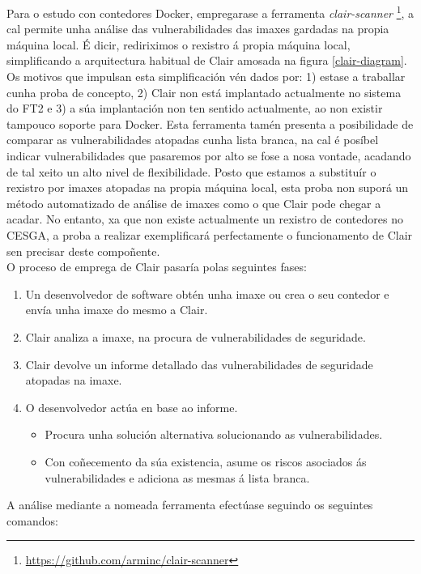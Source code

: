 Para o estudo con contedores Docker, empregarase a ferramenta {\it clair-scanner} \footnote{\url{https://github.com/arminc/clair-scanner}}, a cal permite unha análise das vulnerabilidades das imaxes gardadas na propia máquina local. É dicir, rediriximos o rexistro á propia máquina local, simplificando a arquitectura habitual de Clair amosada na figura \ref{clair-diagram}. Os motivos que impulsan esta simplificación vén dados por: 1) estase a traballar cunha proba de concepto, 2) Clair non está implantado actualmente no sistema do \gls{FT2} e 3) a súa implantación non ten sentido actualmente, ao non existir tampouco soporte para Docker. Esta ferramenta tamén presenta a posibilidade de comparar as vulnerabilidades atopadas cunha lista branca, na cal é posíbel indicar vulnerabilidades que pasaremos por alto se fose a nosa vontade, acadando de tal xeito un alto nivel de flexibilidade. Posto que estamos a substituír o rexistro por imaxes atopadas na propia máquina local, esta proba non suporá un método automatizado de análise de imaxes como o que Clair pode chegar a acadar. No entanto, xa que non existe actualmente un rexistro de contedores no \gls{CESGA}, a proba a realizar exemplificará perfectamente o funcionamento de Clair sen precisar deste compoñente.\\

O proceso de emprega de Clair pasaría polas seguintes fases:

\begin{enumerate}
    \item Un desenvolvedor de software obtén unha imaxe ou crea o seu contedor e envía unha imaxe do mesmo a Clair.
    \item Clair analiza a imaxe, na procura de vulnerabilidades de seguridade.
    \item Clair devolve un informe detallado das vulnerabilidades de seguridade atopadas na imaxe.
    \item O desenvolvedor actúa en base ao informe.
        \begin{itemize}
            \item Procura unha solución alternativa solucionando as vulnerabilidades.
            \item Con coñecemento da súa existencia, asume os riscos asociados ás vulnerabilidades e adiciona as mesmas á lista branca.
        \end{itemize}
\end{enumerate}

A análise mediante a nomeada ferramenta efectúase seguindo os seguintes comandos:

